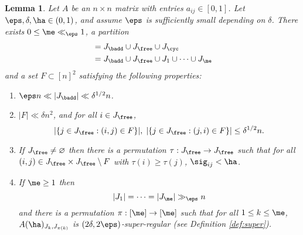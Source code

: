 \documentclass[aop,preprint]{imsart}
\theoremstyle{plain}
\newtheorem{lemma}[theorem]{Lemma}
\theoremstyle{definition}
\theoremstyle{remark}
\numberwithin{equation}{section}
\numberwithin{theorem}{section}
\begin{document}
\begin{lemma}	\label{lem:decomp}
Let $A$ be an $n\times n$ matrix with entries $a_{ij}\in [0,1]$.
Let $\eps,\delta ,\ha\in (0,1)$, and assume $\eps$ is sufficiently small depending on $\delta $.
There exists $0\le \me \ll_\eps1$, a partition 
\begin{align}
[n]&=J_{\badd}\cup J_{\free}\cup J_{\cyc}	\notag\\
&= J_{\badd}\cup J_{\free}\cup J_1\cup\cdots \cup J_{\me }	\label{decomp:bf1}
\end{align}
and a set $F\subset[n]^2$ satisfying the following properties:
\begin{enumerate}[(1)]
\item\label{decomp:1} $\eps n\ll |J_{\badd}|\ll \delta^{1/2} n$.
\item\label{decomp:F} $|F| \ll \delta n^2$, and for all $i\in J_{\free}$,
\begin{equation}	\label{decomp:Frows}
|\{j\in J_{\free}: (i,j) \in F\}|, \; |\{j\in J_{\free}: (j,i) \in F\}| \le \delta^{1/2} n.
\end{equation}
\item\label{decomp:2} If $J_{\free}\ne\varnothing$ then there is a permutation $\tau:J_{\free}\to J_{\free}$ such that for all $(i,j)\in J_{\free}\times J_{\free} \setminus F$ with $\tau(i)\ge \tau(j)$, $\sig_{ij} <\ha$.
\item\label{decomp:3} If $\me \ge 1$ then
\begin{equation}
|J_1|=\cdots = |J_{\me }| \gg_\eps n
\end{equation}
and there is a permutation $\pi:[\me ]\to [\me ]$ such that for all $1\le k\le \me $, $A(\ha)_{J_k,J_{\pi(k)}}$ is $(2\delta,2\eps)$-super-regular 
(see Definition \ref{def:super}).
%
\end{enumerate}
\end{lemma}
\end{document}
